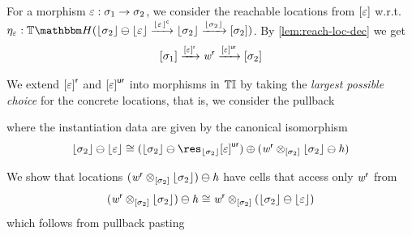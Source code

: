 \begin{definition}\label{def:con-fact}
    For a morphism $\varepsilon : \sigma_1 \to \sigma_2$, we consider the reachable locations from $[\varepsilon]$ w.r.t. $\mvarM_\me : \theapF(\concL{\sigma_2} \ominus \concL\me \xto{\compl{\concL\me}} \concL{\sigma_2} \xto{\concL{\sigma_2}} \anyL{\sigma_2})$.
    By \cref{lem:reach-loc-dec} we get 
    \[ [\sigma_1] \xrightarrow{{[\varepsilon]}^{\mathsf{r}}} \mathit{w}^{\mathsf{r}} \xrightarrow{{[\varepsilon]}^{\mathsf{ur}}} [\sigma_2] \]

    We extend ${[\varepsilon]}^{\mathsf{r}}$ and ${[\varepsilon]}^{\mathsf{ur}}$ into morphisms in ${\mathbb{T}\mathbb{I}}$ by taking the \emph{largest possible choice} for the concrete locations,
    that is, we consider the pullback
    \begin{center}
    \end{center}
    where the instantiation data are given by the canonical isomorphism
    \[ \concL{\sigma_2} \ominus \concL\me \iso (\concL{\sigma_2} \ominus \res_{\concL{\sigma_2}}{\anyL\me}^\ureach) 
                                          \mplus (\vw^\reach \pltimes{\anyL{\sigma_2}} \concL{\sigma_2} \ominus \vh) \]
    
    We show that locations $(\mathit{w}^{\mathsf{r}} \otimes_{[\sigma_2]} \lfloor\sigma_2\rfloor) \ominus \mathit{h}$ have cells that access only $\mathit{w}^{\mathsf{r}}$ from
    \[ (\mathit{w}^{\mathsf{r}} \otimes_{[\sigma_2]} \lfloor\sigma_2\rfloor) \ominus \mathit{h} \cong \mathit{w}^{\mathsf{r}} \otimes_{[\sigma_2]} (\lfloor\sigma_2\rfloor \ominus \lfloor\varepsilon\rfloor) \]
    which follows from pullback pasting
    
    \begin{center}
    \end{center}


\end{definition}
